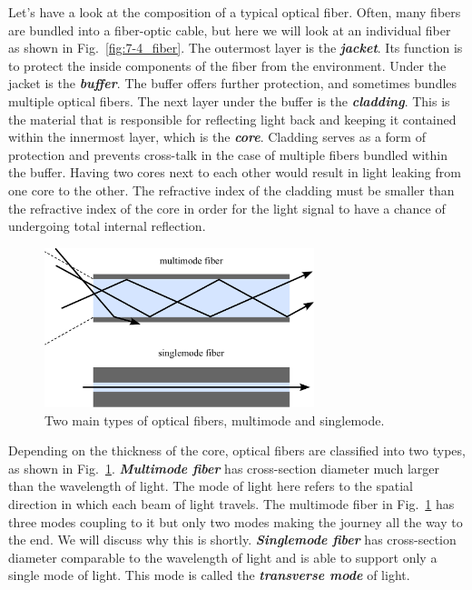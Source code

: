 Let's have a look at the composition of a typical optical fiber.
Often, many fibers are bundled into a fiber-optic cable, but here we will look at an individual fiber as shown in Fig.~\ref{fig:7-4_fiber}. 
The outermost layer is the \textit{\textbf{jacket}}.
Its function is to protect the inside components of the fiber from the environment.
Under the jacket is the \textit{\textbf{buffer}}.
The buffer offers further protection, and sometimes bundles multiple optical fibers.
The next layer under the buffer is the \textit{\textbf{cladding}}.
This is the material that is responsible for reflecting light back and keeping it contained within the innermost layer, which is the \textit{\textbf{core}}.
Cladding serves as a form of protection and prevents cross-talk in the case of multiple fibers bundled within the buffer.
Having two cores next to each other would result in light leaking from one core to the other.
The refractive index of the cladding must be smaller than the refractive index of the core in order for the light signal to have a chance of undergoing total internal reflection.

\begin{figure}[t]
    \centering
    \includegraphics[width=0.7\textwidth]{lesson7/7-4_multi_single_fiber.pdf}
    \caption[Multimode and singlemode fibers]{Two main types of optical fibers, multimode and singlemode.}
    \label{fig:7-4_multimode_singlemode_fiber}
\end{figure}

Depending on the thickness of the core, optical fibers are classified into two types, as shown in Fig.~\ref{fig:7-4_multimode_singlemode_fiber}.
\textit{\textbf{Multimode fiber}} has cross-section diameter much larger than the wavelength of light.
The mode of light here refers to the spatial direction in which each beam of light travels.
The multimode fiber in Fig.~\ref{fig:7-4_multimode_singlemode_fiber} has three modes coupling to it but only two modes making the journey all the way to the end.
We will discuss why this is shortly.
\textit{\textbf{Singlemode fiber}}  has cross-section diameter comparable to the wavelength of light and is able to support only a single mode of light.
This mode is called the \textit{\textbf{transverse mode}}  of light.

